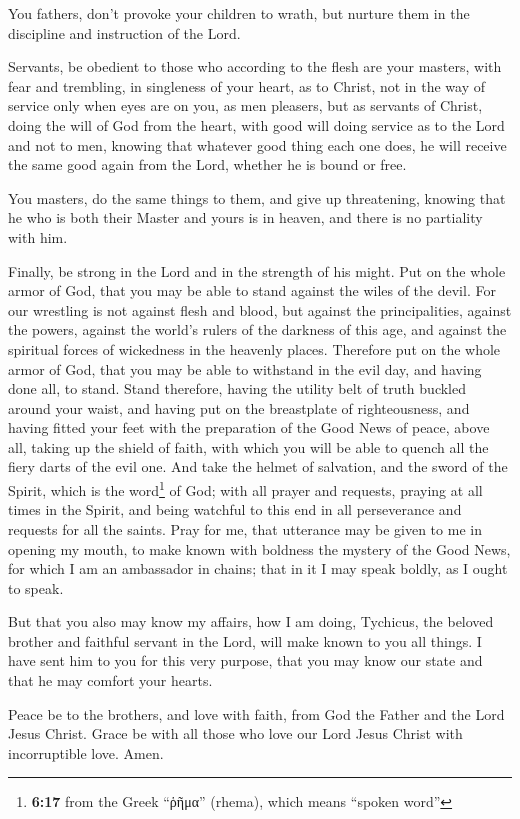  You fathers, don't provoke your children to wrath, but
nurture them in the discipline and instruction of the Lord.

 Servants, be obedient to those who according to the flesh
are your masters, with fear and trembling, in singleness of your heart,
as to Christ,  not in the way of service only when eyes
are on you, as men pleasers, but as servants of Christ, doing the will
of God from the heart,  with good will doing service as to
the Lord and not to men,  knowing that whatever good thing
each one does, he will receive the same good again from the Lord,
whether he is bound or free.

 You masters, do the same things to them, and give up
threatening, knowing that he who is both their Master and yours is in
heaven, and there is no partiality with him.

 Finally, be strong in the Lord and in the strength of
his might.  Put on the whole armor of God, that you may
be able to stand against the wiles of the devil.  For our
wrestling is not against flesh and blood, but against the
principalities, against the powers, against the world's rulers of the
darkness of this age, and against the spiritual forces of wickedness in
the heavenly places.  Therefore put on the whole armor of
God, that you may be able to withstand in the evil day, and having done
all, to stand.  Stand therefore, having the utility belt
of truth buckled around your waist, and having put on the breastplate of
righteousness,  and having fitted your feet with the
preparation of the Good News of peace,  above all, taking
up the shield of faith, with which you will be able to quench all the
fiery darts of the evil one.  And take the helmet of
salvation, and the sword of the Spirit, which is the word\footnote{\textbf{6:17}
  from the Greek ``ῥῆμα'' (rhema), which means ``spoken word''} of God;
 with all prayer and requests, praying at all times in
the Spirit, and being watchful to this end in all perseverance and
requests for all the saints.  Pray for me, that utterance
may be given to me in opening my mouth, to make known with boldness the
mystery of the Good News,  for which I am an ambassador
in chains; that in it I may speak boldly, as I ought to speak.

 But that you also may know my affairs, how I am doing,
Tychicus, the beloved brother and faithful servant in the Lord, will
make known to you all things.  I have sent him to you for
this very purpose, that you may know our state and that he may comfort
your hearts.

 Peace be to the brothers, and love with faith, from God
the Father and the Lord Jesus Christ.  Grace be with all
those who love our Lord Jesus Christ with incorruptible love. Amen.
